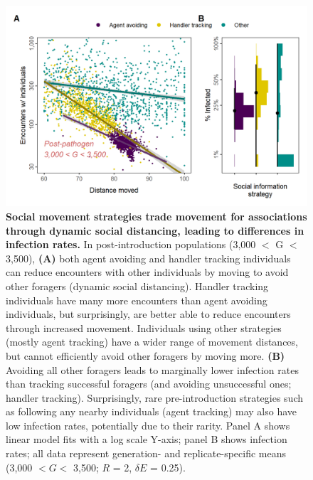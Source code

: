 \begin{figure}[!h]
    \centering
    \includegraphics[width=0.9\linewidth]{figures/pathomove/fig_02.png}
    \caption{
        \textbf{Social movement strategies trade movement for associations through dynamic social distancing, leading to differences in infection rates.}
        In post-introduction populations (3,000 $<$ G $<$ 3,500), \textbf{(A)} both agent avoiding and handler tracking individuals can reduce encounters with other individuals by moving to avoid other foragers (dynamic social distancing).
        Handler tracking individuals have many more encounters than agent avoiding individuals, but surprisingly, are better able to reduce encounters through increased movement.
        Individuals using other strategies (mostly agent tracking) have a wider range of movement distances, but cannot efficiently avoid other foragers by moving more.
        \textbf{(B)} Avoiding all other foragers leads to marginally lower infection rates than tracking successful foragers (and avoiding unsuccessful ones; handler tracking).
        Surprisingly, rare pre-introduction strategies such as following any nearby individuals (agent tracking) may also have low infection rates, potentially due to their rarity.
        Panel A shows linear model fits with a log scale Y-axis; panel B shows infection rates; all data represent generation- and replicate-specific means (3,000 $< G <$ 3,500; $R$ = 2, $\delta E$ = 0.25).
    }\label{patho_fig_02}
\end{figure}

